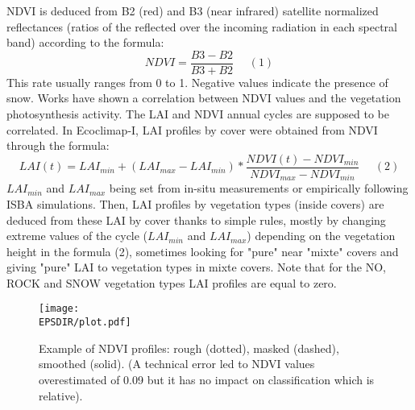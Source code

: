 NDVI is deduced from B2 (red) and B3 (near infrared) satellite normalized reflectances (ratios of the reflected over the incoming radiation 
in each spectral band) 
according to the formula: 
\begin{displaymath}
NDVI=\frac{B3-B2}{B3+B2}~~~~~~(1)
\end{displaymath}
This rate usually ranges from 0 to 1. Negative values indicate the presence of snow. Works have shown a correlation between NDVI values and the 
vegetation photosynthesis activity. The LAI and NDVI annual cycles are supposed to be correlated. In Ecoclimap-I, 
LAI profiles by cover were obtained from NDVI through the formula: 
\begin{displaymath}
LAI(t)=LAI_{min}+(LAI_{max}-LAI_{min})*\frac{NDVI(t)-NDVI_{min}}{NDVI_{max}-NDVI_{min}}~~~~~~(2)
\end{displaymath} 
$LAI_{min}$ and $LAI_{max}$ being set from in-situ measurements or empirically following ISBA simulations. Then, LAI profiles by vegetation types 
(inside covers) are deduced from these LAI by cover thanks to simple rules, mostly by changing extreme values of the cycle ($LAI_{min}$ and $LAI_{max}$) 
depending on the vegetation height in the formula (2), sometimes looking for "pure" near "mixte" covers and giving "pure" LAI to 
vegetation types in mixte covers. Note that for the NO, ROCK and SNOW vegetation types LAI profiles are equal to zero. \\

 
\begin{figure}
\begin{center}
\texttt{[image: \\EPSDIR/plot.pdf]}
\caption{\label{figure1} Example of NDVI profiles: rough (dotted), masked (dashed), smoothed (solid). 
(A technical error led to NDVI values overestimated of 0.09 but it has no impact on classification which is relative). }
\end{center}
\end{figure}

